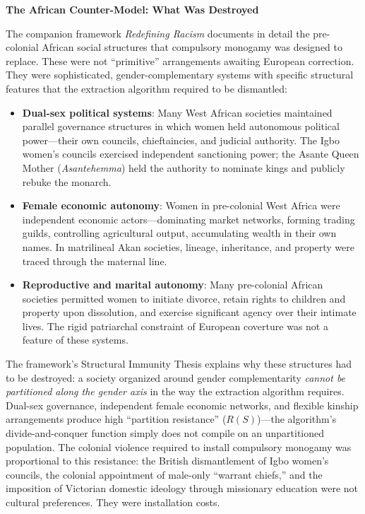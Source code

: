 \documentclass[12pt, letterpaper]{article}
\begin{document}
\textbf{The African Counter-Model: What Was Destroyed}

The companion framework \textit{Redefining Racism} documents in detail the pre-colonial African social structures that compulsory monogamy was designed to replace. These were not ``primitive'' arrangements awaiting European correction. They were sophisticated, gender-complementary systems with specific structural features that the extraction algorithm required to be dismantled:

\begin{itemize}
    \item \textbf{Dual-sex political systems}: Many West African societies maintained parallel governance structures in which women held autonomous political power---their own councils, chieftaincies, and judicial authority. The Igbo women's councils exercised independent sanctioning power; the Asante Queen Mother (\textit{Asantehemma}) held the authority to nominate kings and publicly rebuke the monarch.
    
    \item \textbf{Female economic autonomy}: Women in pre-colonial West Africa were independent economic actors---dominating market networks, forming trading guilds, controlling agricultural output, accumulating wealth in their own names. In matrilineal Akan societies, lineage, inheritance, and property were traced through the maternal line.
    
    \item \textbf{Reproductive and marital autonomy}: Many pre-colonial African societies permitted women to initiate divorce, retain rights to children and property upon dissolution, and exercise significant agency over their intimate lives. The rigid patriarchal constraint of European coverture was not a feature of these systems.
\end{itemize}

The framework's Structural Immunity Thesis explains why these structures had to be destroyed: a society organized around gender complementarity \textit{cannot be partitioned along the gender axis} in the way the extraction algorithm requires. Dual-sex governance, independent female economic networks, and flexible kinship arrangements produce high ``partition resistance'' ($R(S)$)---the algorithm's divide-and-conquer function simply does not compile on an unpartitioned population. The colonial violence required to install compulsory monogamy was proportional to this resistance: the British dismantlement of Igbo women's councils, the colonial appointment of male-only ``warrant chiefs,'' and the imposition of Victorian domestic ideology through missionary education were not cultural preferences. They were installation costs.
\end{document}
